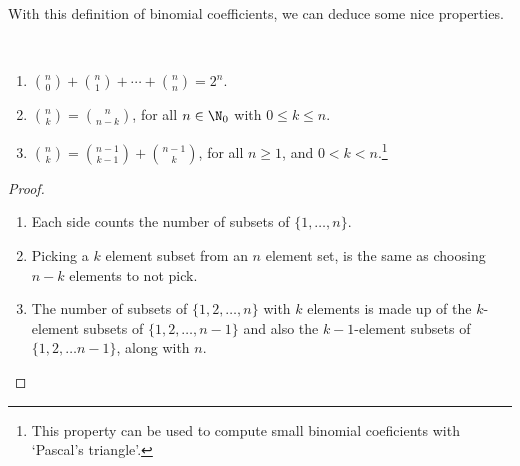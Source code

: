 \documentclass[a4paper]{scrreprt}
\begin{document}
With this definition of binomial coefficients, we can deduce some nice properties.

\begin{proposition}~
	\vspace{-1.5\baselineskip}
	\begin{enumerate}[label=(\roman*)]
	\item $\binom{n}{0} + \binom{n}{1} + \cdots + \binom{n}{n} = 2^n$.
	\item $\binom{n}{k} = \binom{n}{n - k}$, for all $n \in \N_0$ with $0 \leq k \leq n$.
	\item $\binom{n}{k} = \binom{n - 1}{k - 1} + \binom{n - 1}{k}$, for all $n \geq 1$, and $0 < k < n$.\footnote{This property can be used to compute small binomial coeficients with `Pascal's triangle'.}
\end{enumerate}	
\end{proposition}
\begin{proof}
	\begin{enumerate}[label=(\roman*)]
		\item Each side counts the number of subsets of $\{1, \dots, n\}$.
		\item Picking a $k$ element subset from an $n$ element set, is the same as choosing $n - k$ elements to not pick.
		\item The number of subsets of $\{1, 2, \dots, n\}$ with $k$ elements is made up of the $k$-element subsets of $\{1, 2, \dots, n - 1\}$ and also the $k - 1$-element subsets of $\{1, 2, \dots n - 1\}$, along with $n$.
	\end{enumerate}
\end{proof}



	



\end{document}
